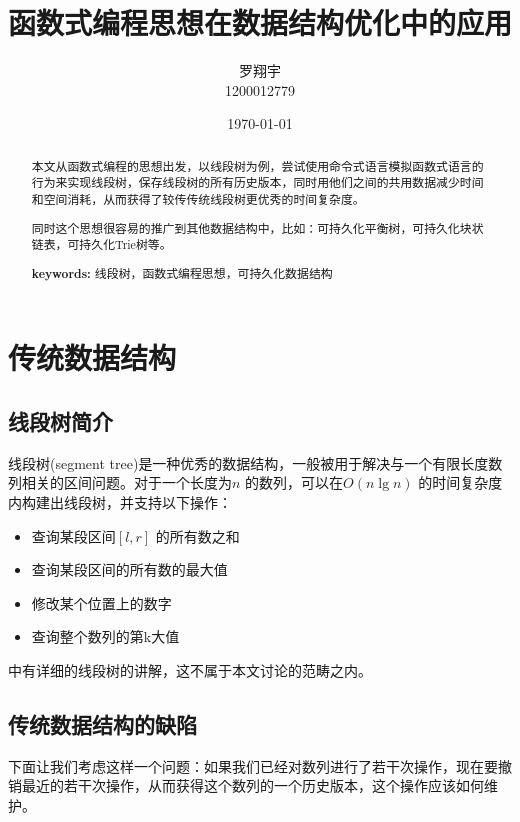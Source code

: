 \documentclass[a4paper]{article}
\begin{document}
\title{函数式编程思想在数据结构优化中的应用}
\author{罗翔宇\\1200012779}
\date{\today}

\maketitle

\begin{abstract}
	本文从函数式编程的思想出发，以线段树为例，尝试使用命令式语言模拟函数式语言的行为来实现线段树，保存线段树的所有历史版本，同时用他们之间的共用数据减少时间和空间消耗，从而获得了较传传统线段树更优秀的时间复杂度。

	同时这个思想很容易的推广到其他数据结构中，比如：可持久化平衡树，可持久化块状链表，可持久化Trie树等。

	\vspace{0.2cm}
	\textbf{keywords:} 线段树，函数式编程思想，可持久化数据结构
\end{abstract}

\section{传统数据结构}
\subsection{线段树简介}
线段树(segment tree)\cite{wiki1}是一种优秀的数据结构，一般被用于解决与一个有限长度数列相关的区间问题。对于一个长度为$n$ 的数列，可以在$O(n\lg n)$ 的时间复杂度内构建出线段树，并支持以下操作：
\begin{itemize}
	\item 查询某段区间$[l, r]$ 的所有数之和

	\item 查询某段区间的所有数的最大值

	\item 修改某个位置上的数字

	\item 查询整个数列的第k大值
\end{itemize}
\cite{wiki1}中有详细的线段树的讲解，这不属于本文讨论的范畴之内。

\subsection{传统数据结构的缺陷}
下面让我们考虑这样一个问题：如果我们已经对数列进行了若干次操作，现在要撤销最近的若干次操作，从而获得这个数列的一个历史版本，这个操作应该如何维护。
\end{document}
